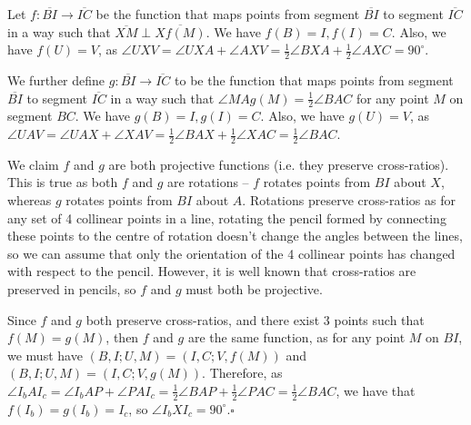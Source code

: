\documentclass[10pt]{article}
\begin{document}
	
	
	
	Let $f:\overline{BI} \to \overline{IC}$ be the function that maps points from segment $\overline{BI}$ to segment $\overline{IC}$ in a way such that $\overline{XM} \perp \overline{Xf(M)}$. We have $f(B) = I, f(I) = C$. Also, we have $f(U) = V$, as $\angle UXV = \angle UXA + \angle AXV = \frac{1}{2} \angle BXA + \frac{1}{2} \angle AXC = 90^{\circ}$.
	
	We further define $g:\overline{BI} \to \overline{IC}$ to be the function that maps points from segment $\overline{BI}$ to segment $\overline{IC}$ in a way such that $\angle MAg(M) = \frac{1}{2} \angle BAC$ for any point \(M\) on segment \(BC\). We have $g(B) = I, g(I) = C$. Also, we have $g(U) = V$, as $\angle UAV = \angle UAX + \angle XAV = \frac{1}{2} \angle BAX + \frac{1}{2} \angle XAC = \frac{1}{2} \angle BAC$.
	
	We claim $f$ and $g$ are both projective functions (i.e. they preserve cross-ratios). This is true as both $f$ and $g$ are rotations -- $f$ rotates points from $BI$ about $X$, whereas $g$ rotates points from $BI$ about $A$. Rotations preserve cross-ratios as for any set of 4 collinear points in a line, rotating the pencil formed by connecting these points to the centre of rotation doesn't change the angles between the lines, so we can assume that only the orientation of the 4 collinear points has changed with respect to the pencil. However, it is well known that cross-ratios are preserved in pencils, so \(f\) and \(g\) must both be projective.
	
	Since $f$ and $g$ both preserve cross-ratios, and there exist 3 points such that $f(M) = g(M)$, then $f$ and $g$ are the same function, as for any point $M$ on $BI$, we must have $(B, I; U, M) = (I, C; V, f(M))$ and $(B, I; U, M) = (I, C; V, g(M))$. Therefore, as $\angle I_b A I_c = \angle I_b AP + \angle PAI_c = \frac{1}{2} \angle BAP + \frac{1}{2} \angle PAC = \frac{1}{2} \angle BAC$, we have that \(f(I_b) = g(I_b) = I_c\), so $\angle I_bXI_c = 90^{\circ}$.\hfill \ensuremath{\square}
	
\end{document}

